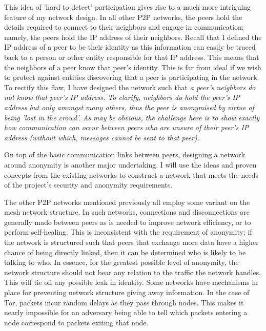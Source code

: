 \documentclass[ %
                    author={Luke Murray},
                supervisor={Dr. Simon Hollis},
                     title={Shadow Peer-to-Peer Networks},
                  subtitle={},
                    degree={MEng},
                      year={2013} ]{thesis}
\begin{document}
This idea of 'hard to detect' participation gives rise to a much more intriguing feature of my network design. In all other P2P networks, the peers hold the details required to connect to their neighbors and engage in communication; namely, the peers hold the IP address of their neighbors. Recall that I defined the IP address of a peer to be their identity as this information can easily be traced back to a person or other entity responsible for that IP address. This means that the neighbors of a peer know that peer's identity. This is far from ideal if we wish to protect against entities discovering that a peer is participating in the network. To rectify this flaw, I have designed the network such that \em{a peer's neighbors do not know that peer's IP address}. To clarify, neighbors do hold the peer's IP address but only amongst many others, thus the peer is anonymised by virtue of being 'lost in the crowd'. As may be obvious, the challenge here is to show exactly how communication can occur between peers who are unsure of their peer's IP address (without which, messages cannot be sent to that peer).

On top of the basic communication links between peers, designing a network around anonymity is another major undertaking. I will use the ideas and proven concepts from the existing networks to construct a network that meets the needs of the project's security and anonymity requirements.

The other P2P networks mentioned previously all employ some variant on the mesh network structure. In such networks, connections and disconnections are generally made between peers as is needed to improve network efficiency, or to perform self-healing. This is inconsistent with the requirement of anonymity; if the network is structured such that peers that exchange more data have a higher chance of being directly linked, then it can be determined who is likely to be talking to who. In essence, for the greatest possible level of anonymity, the network structure should not bear any relation to the traffic the network handles. This will tie off any possible leak in identity. Some networks have mechanisms in place for preventing network structure giving away information. In the case of Tor, packets incur random delays as they pass through nodes. This makes it nearly impossible for an adversary being able to tell which packets entering a node correspond to packets exiting that node. 

\end{document}
